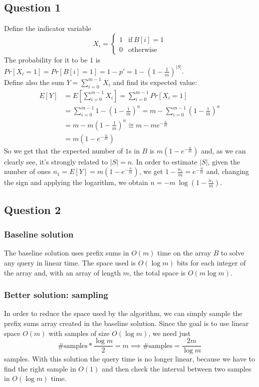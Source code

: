 \documentclass{article}
\begin{document}
\subsection{Question 1}
Define the indicator variable
$$
X_i=\begin{cases}
1 & \textrm{if}\ B[i]=1\\
0 & \textrm{otherwise}
\end{cases}
$$
The probability for it to be $1$ is $Pr[X_i=1]=Pr[B[i]=1]=1-p'=1-(1-\frac{1}{m})^{|S|}$.\\
Define also the sum $Y=\sum_{i=0}^{m-1} X_i$ and find its expected value:
\begin{align*}
E[Y]&=E\left[\sum_{i=0}^{m-1} X_i\right]=\sum_{i=0}^{m-1} Pr[X_i=1]\\
&=\sum_{i=0}^{m-1} 1-\left(1-\frac{1}{m}\right)^n = m-\sum_{i=0}^{m-1}\left(1-\frac{1}{m}\right)^n\\
&=m-m\left(1-\frac{1}{m}\right)^n \cong m-me^{-\frac{n}{m}}\\
&=m\left(1-e^{-\frac{n}{m}}\right)
\end{align*}
So we get that the expected number of $1$s in $B$ is $m(1-e^{-\frac{n}{m}})$ and, as we can clearly see, it's strongly related to $|S|=n$. 
In order to estimate $|S|$, given the number of ones $n_1=E[Y]=m(1-e^{-\frac{n}{m}})$, we get $1-\frac{n_1}{m}=e^{-\frac{n}{m}}$ and, changing the sign and applying the logarithm, we obtain $n=-m\ \log(1-\frac{n_1}{m})$.

\subsection{Question 2}
\subsubsection{Baseline solution}
The baseline solution uses prefix sums in $O(m)$ time on the array $B$ to solve any query in linear time.
The space used is $O(\log m)$ bits for each integer of the array and, with an array of length $m$, the total space is $O(m\log m)$.

\subsubsection{Better solution: sampling}
In order to reduce the space used by the algorithm, we can simply sample the prefix sums array created in the baseline solution. Since the goal is to use linear space $O(m)$ with samples of size $O(\log m)$, we need just $$\textrm{\# samples}*\frac{\log m}{2}=m \implies \textrm{\# samples}=\frac{2m}{\log m}$$ samples. With this solution the query time is no longer linear, because we have to find the right sample in $O(1)$ and then check the interval between two samples in $O(\log m)$ time.
\end{document}
